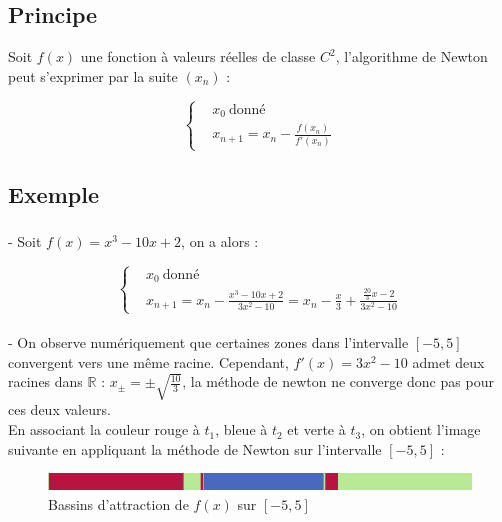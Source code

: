 \documentclass{article}
\begin{document}
\subsection{Principe}

Soit $f(x)$ une fonction à valeurs réelles de classe $C^2$, l'algorithme de Newton peut s'exprimer par la suite $(x_n)$ :

\begin{equation*}
    \left \{
    \begin{aligned}
      & x_0 \ \text{donné} \\
      & x_{n + 1} = x_n - \frac{f(x_n)}{f'(x_n)}
    \end{aligned} \right.
\end{equation*} 

\subsection{Exemple}

\subsubsection{}

 - Soit $f(x) = x^3 - 10x + 2$, on a alors : 

 \begin{equation*}
    \left \{
    \begin{aligned}
      & x_0 \ \text{donné} \\
      & x_{n + 1} = x_n - \frac{x^3 - 10x + 2}{3x^2 - 10} = x_n - \frac{x}{3} + \frac{\frac{20}{3}x - 2}{3x^2 - 10}
    \end{aligned} \right.
\end{equation*} \\


- On observe numériquement que certaines zones dans l'intervalle $[-5, 5]$ convergent
vers une même racine. Cependant, $f'(x) = 3x^2-10$ admet deux racines dans $\mathbb{R}$ :
$x_{\pm} = \pm\sqrt{\frac{10}{3}}$, la méthode de newton ne converge donc pas pour ces deux valeurs. \\

En associant la couleur rouge à $t_1$, bleue à $t_2$ et verte à $t_3$, on obtient l'image suivante en 
appliquant la méthode de Newton sur l'intervalle $[-5, 5]$ :

\begin{figure}[ht!]
    \centering
    \includegraphics{figures/newton_bassins.png}
    \caption{Bassins d'attraction de $f(x)$ sur $[-5, 5]$}
\end{figure}
\end{document}

